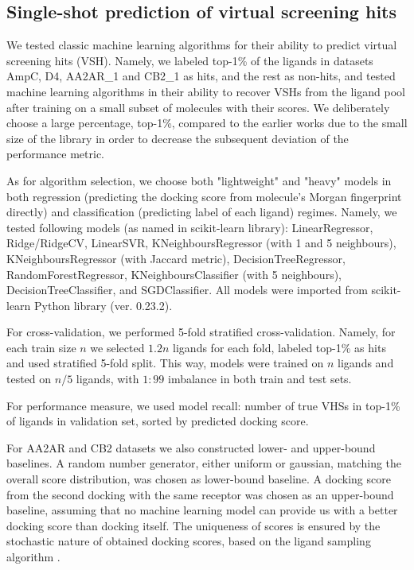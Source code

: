 \subsection{Single-shot prediction of virtual screening hits}
We tested classic machine learning algorithms for their ability to predict virtual screening hits (VSH). Namely, we labeled top-1\% of the ligands in datasets AmpC, D4, AA2AR\_1 and CB2\_1 as hits, and the rest as non-hits, and tested machine learning algorithms in their ability to recover VSHs from the ligand pool after training on a small subset of molecules with their scores. We deliberately choose a large percentage, top-1\%, compared to the earlier works \cite{Graff2021AcceleratingLearning, logistic_regression, Yang2021_shoichet_active_learning} due to the small size of the library in order to decrease the subsequent deviation of the performance metric.

As for algorithm selection, we choose both "lightweight" and "heavy" models in both regression (predicting the docking score from molecule's Morgan fingerprint directly) and classification (predicting label of each ligand) regimes. Namely, we tested following models (as named in scikit-learn library): LinearRegressor, Ridge/RidgeCV, LinearSVR, KNeighboursRegressor (with 1 and 5 neighbours), KNeighboursRegressor (with Jaccard metric), DecisionTreeRegressor, RandomForestRegressor, KNeighboursClassifier (with 5 neighbours), DecisionTreeClassifier, and SGDClassifier. All models were imported from scikit-learn Python library \cite{scikit-learn} (ver. 0.23.2). 

For cross-validation, we performed 5-fold stratified cross-validation. Namely, for each train size $n$ we selected $1.2n$ ligands for each fold, labeled top-1\% as hits and used stratified 5-fold split. This way, models were trained on $n$ ligands and tested on $n/5$ ligands, with $1:99$ imbalance in both train and test sets.

For performance measure, we used model recall: number of true VHSs in top-1\% of ligands in validation set, sorted by predicted docking score.

For AA2AR and CB2 datasets we also constructed lower- and upper-bound baselines. A random number generator, either uniform or gaussian, matching the overall score distribution, was chosen as lower-bound baseline. A docking score from the second docking with the same receptor was chosen as an upper-bound baseline, assuming that no machine learning model can provide us with a better docking score than docking itself. The uniqueness of scores is ensured by the stochastic nature of obtained docking scores, based on the ligand sampling algorithm \cite{abagyan_biased_1994}.

